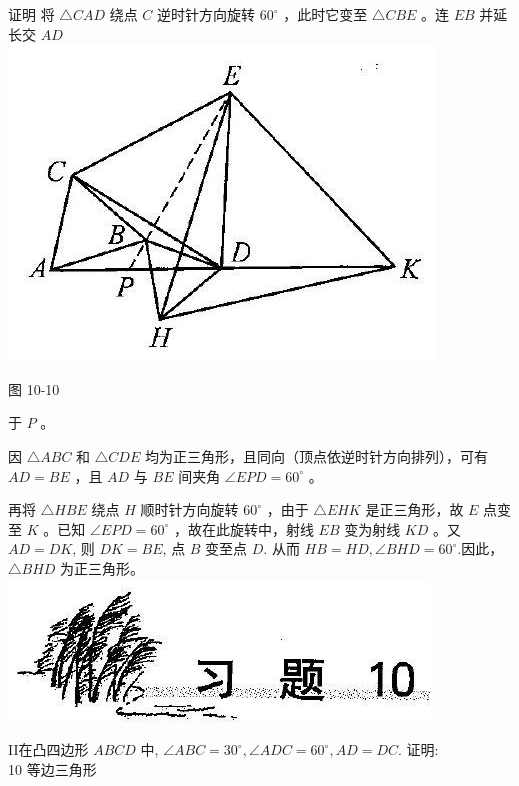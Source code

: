 \documentclass[10pt]{article}
\begin{document}
证明 将 $\triangle C A D$ 绕点 $C$ 逆时针方向旋转 $60^{\circ}$ ，此时它变至 $\triangle C B E$ 。连 $E B$ 并延长交 $A D$\\
\includegraphics[max width=\textwidth, center]{2024_10_30_2c8f45efd4a519b08e1ag-099(2)}

图 10-10

于 $P$ 。

因 $\triangle A B C$ 和 $\triangle C D E$ 均为正三角形，且同向（顶点依逆时针方向排列），可有 $A D=B E$ ，且 $A D$ 与 $B E$ 间夹角 $\angle E P D=60^{\circ}$ 。

再将 $\triangle H B E$ 绕点 $H$ 顺时针方向旋转 $60^{\circ}$ ，由于 $\triangle E H K$ 是正三角形，故 $E$ 点变至 $K$ 。已知 $\angle E P D=60^{\circ}$ ，故在此旋转中，射线 $E B$ 变为射线 $K D$ 。又 $A D=D K$, 则 $D K=B E$, 点 $B$ 变至点 $D$. 从而 $H B=H D, \angle B H D=60^{\circ}$.因此， $\triangle B H D$ 为正三角形。\\
\includegraphics[max width=\textwidth, center]{2024_10_30_2c8f45efd4a519b08e1ag-099(1)}

II在凸四边形 $A B C D$ 中, $\angle A B C=30^{\circ}, \angle A D C=60^{\circ}, A D=D C$. 证明:\\
10 等边三角形
\end{document}
